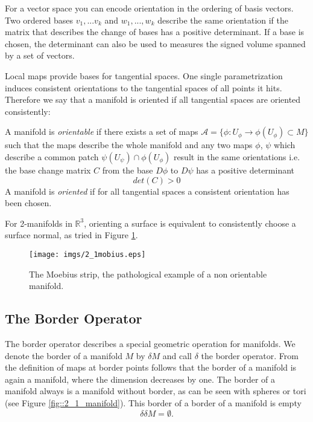 For a vector space you can encode orientation in the ordering of basis vectors. Two ordered bases $v_1,...v_k$ and $w_1,...,w_k$ describe the same orientation if the matrix that describes the change of bases has a positive determinant. If a base is chosen, the determinant can also be used to measures the signed volume spanned by a set of vectors.



Local maps provide bases for tangential spaces. One single parametrization induces consistent orientations to the tangential spaces of all points it hits. Therefore we say that a manifold is oriented if all tangential spaces are oriented consistently:

\begin{definition} A manifold is \emph{orientable} if there exists a set of maps $\mathcal A = \{\phi: U_\phi \to \phi(U_\phi) \subset M\}$ such that the maps describe the whole manifold and any two maps $\phi$, $\psi$ which describe a common patch $\psi(U_\psi) \cap \phi(U_\phi)$ result in the same orientations i.e. the base change matrix $C$ from the base $D\phi$ to $D\psi$ has a positive determinant
\[det(C) >0\]
A manifold is \emph{oriented} if for all tangential spaces a consistent orientation has been chosen.

\end{definition}

For 2-manifolds in $\mathbb R^3$, orienting a surface is equivalent to consistently choose a surface normal, as tried in Figure \ref{fig::2_1_mobius}.

\begin{figure}[t]
\begin{center}
\texttt{[image: imgs/2\_1mobius.eps]}
\caption{The Moebius strip, the pathological example of a non orientable manifold.}
\label{fig::2_1_mobius}
\end{center}
\end{figure}

\subsection{The Border Operator}
The border operator describes a special geometric operation for manifolds. 
We denote the border of a manifold $M$ by $\delta M$ and call $\delta$ the border operator. From the definition of maps at border points follows that the border of a manifold is again a manifold, where the dimension decreases by one. The border of a manifold always is a manifold without border, as can be seen with spheres or tori (see Figure \ref{fig::2_1_manifold}). This border of a border of a manifold is empty
\[\delta\delta M = \emptyset.\]

